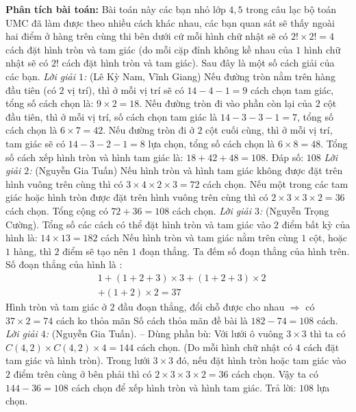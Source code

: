 \begin{multicols}{2}
\begin{figure}[H]
			\vspace*{-15pt}
		\end{figure}
	\vskip 0.1cm
	\textbf{\color{toancuabi}Phân tích bài toán:} Bài toán này các bạn nhỏ lớp $4,5$ trong câu lạc bộ toán UMC đã làm được theo nhiều cách khác nhau, các bạn quan sát sẽ thấy ngoài hai điểm ở hàng trên cùng thi bên dưới cứ mỗi hình chữ nhật sẽ có $2!\times 2!=4$ cách đặt hình tròn và tam giác (do mỗi cặp đỉnh không kề nhau của $1$ hình chữ nhật sẽ có $2!$ cách đặt hình tròn và tam giác). Sau đây là một số cách giải của các bạn.
	\vskip 0.1cm
	\textit{Lời giải $1$: }(Lê Kỳ Nam, Vĩnh Giang)
	\vskip 0.1cm
	Nếu đường tròn nằm trên hàng đầu tiên (có $2$ vị trí), thì ở mỗi vị trí sẽ có $14 - 4 - 1 = 9$ cách chọn tam giác, tổng số cách chọn là: $9 \times 2 = 18$.
	\vskip 0.1cm
	Nếu đường tròn đi vào phần còn lại của $2$ cột đầu tiên, thì ở mỗi vị trí, số cách chọn tam giác là $14 - 3 - 3 - 1 = 7$, tổng số cách chọn là $6 \times 7 = 42$.
	\vskip 0.1cm
	Nếu đường tròn đi ở $2$ cột cuối cùng, thì ở mỗi vị trí, tam giác sẽ có $14 - 3 - 2 - 1 = 8$ lựa chọn, tổng số cách chọn là $6 \times 8 = 48$.
	\vskip 0.1cm
	Tổng số cách xếp hình tròn và hình tam giác là: $18 + 42 + 48 = 108$.
	\vskip 0.1cm
	Đáp số: $108$
	\vskip 0.1cm
	\textit{Lời giải $2$:} (Nguyễn Gia Tuấn)
	\vskip 0.1cm
	Nếu hình tròn và hình tam giác không được đặt trên hình vuông trên cùng thì có $3 \times 4 \times 2 \times 3 = 72$ cách chọn.
	\vskip 0.1cm
	Nếu một trong các tam giác hoặc hình tròn được đặt trên hình vuông trên cùng thì có $2 \times 3 \times 3 \times 2 = 36$ cách chọn.
	\vskip 0.1cm
	Tổng cộng có $72 + 36 = 108$ cách chọn.
	\vskip 0.1cm
	\textit{Lời giải $3$:} (Nguyễn Trọng Cường).
	\vskip 0.1cm
	Tổng số các cách có thể đặt hình tròn và tam giác vào $2$ điểm bất kỳ của hình là: $14\times13 = 182$ cách
	\vskip 0.1cm
	Nếu hình tròn và tam giác nằm trên cùng $1$ cột, hoặc $1$ hàng, thì $2$ điểm sẽ tạo nên $1$ đoạn thẳng. Ta đếm số đoạn thẳng của hình trên.
	\vskip 0.1cm
	Số đoạn thẳng của hình là :
	\begin{align*}
		&1 + (1+2+3) \times 3 + (1+2+3) \times 2 \\
		&+ (1+2) \times 2 = 37
	\end{align*}
	Hình tròn và tam giác ở $2$ đầu đoạn thẳng, đổi chỗ được cho nhau $\Rightarrow$ có $37 \times 2 = 74$ cách ko thỏa mãn
	\vskip 0.1cm
	Số cách thỏa mãn đề bài là $182 - 74 = 108$ cách.
	\vskip 0.1cm
	\textit{Lời giải $4$:} (Nguyễn Gia Tuấn). -- Dùng phần bù:
	\vskip 0.1cm
	Với lưới ô vuông $3 \times 3$ thì ta có $C(4,2)\times C(4,2)\times 4 = 144$ cách chọn. (Do mỗi hình chữ nhật có $4$ cách đặt tam giác và hình tròn).
	\vskip 0.1cm
	Trong lưới $3 \times 3$ đó, nếu đặt hình tròn hoặc tam giác vào $2$ điểm trên cùng ở bên phải thì có $2 \times 3 \times  3 \times 2 = 36$ cách chọn.
	\vskip 0.1cm
	Vậy ta có $144 - 36 = 108$ cách chọn để xếp hình tròn và hình tam giác.
	\vskip 0.1cm
	Trả lời: $108$ lựa chọn.
\end{multicols}
